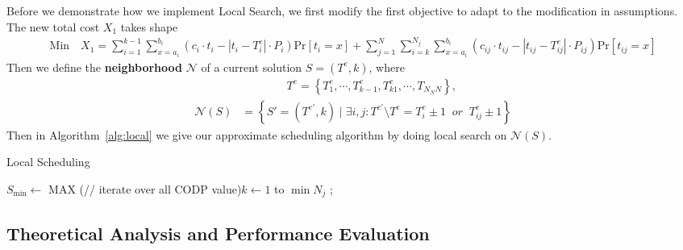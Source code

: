 \documentclass{llncs}
\begin{document}
Before we demonstrate how we implement Local Search, we first modify the first objective to adapt to the modification in assumptions. The new total cost $X_1$ takes shape
\begin{align}\label{goal-new}
    \text{Min} \quad X_1=\sum_{i=1}^{k-1}\sum_{x=a_i}^{b_i}(c_i\cdot t_i-|t_i-T_i^e|\cdot P_i)\text{Pr}[t_i=x]+\sum_{j=1}^N\sum_{i=k}^{N_j}\sum_{x=a_i}^{b_i}(c_{ij}\cdot t_{ij}-|t_{ij}-T_{ij}^e|\cdot P_{ij})\text{Pr}[t_{ij}=x]
\end{align}
Then we define the \textbf{neighborhood} $\mathcal{N}$ of a current solution $S=(T^e,k)$, where 
\begin{align}
    &\qquad\qquad T^e=\left\{T_1^e,\cdots,T_{k-1}^e,T_{k1}^e,\cdots,T_{N_NN}\right\},\\
    \mathcal{N}(S)&=\left\{S'=(T^{e'},k)\;\bigg|\;\exists i,j:T^{e'}\setminus T^e=T_i^e\pm1\;\;or\;\;T_{ij}^e\pm1
    \right\}
\end{align}
Then in Algorithm~\ref{alg:local} we give our approximate scheduling algorithm by doing local search on $\mathcal{N}(S)$.
\begin{minipage}{\textwidth}
    \centering
    \begin{algorithm}[H]
    \caption{Local Scheduling}\label{alg:local}
    \BlankLine
    $S_{\min}\leftarrow$ MAX\;
    \For(\qquad// iterate over all CODP value){$k\leftarrow1$ to $\min N_j$}{
    }
    ;
    \end{algorithm}
    \end{minipage}
\subsection{Theoretical Analysis and Performance Evaluation}
\end{document}
